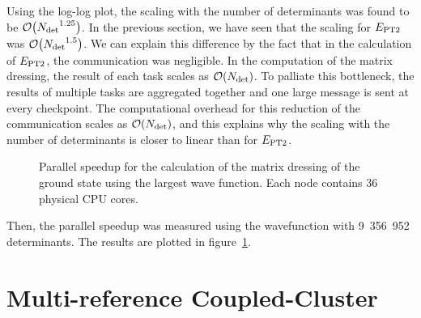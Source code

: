 \documentclass[./thesis.tex]{subfiles}
\begin{document}
Using the log-log plot, the scaling with the number of determinants was found to be
$\order{\Ndet^{1.25}}$. In the previous section, we have seen that the scaling for $E_\text{PT2}$ was
$\order{\Ndet^{1.5}}$. We can explain this difference by the fact that in the 
calculation of $E_\text{PT2}$, the communication was negligible. In the computation of the
matrix dressing, the result of each task scales as $\order{\Ndet}$. To palliate this 
bottleneck, the results of multiple tasks are aggregated together and one large message is
sent at every checkpoint. The computational overhead for this reduction of the communication
scales as $\order{\Ndet}$, and this explains why the scaling with the number of determinants is
closer to linear than for $E_\text{PT2}$.

\begin{figure}[hbt]
	\begin{center}
		\caption{Parallel speedup for the calculation of the matrix dressing of the ground state using the largest wave function. Each node contains 36 physical CPU cores.}
		\label{fig:scaling_node_sbk}
	\end{center}
\end{figure}

Then, the parallel speedup was measured using the wavefunction with 9~356~952 determinants. The results
are plotted in figure~\ref{fig:scaling_node_sbk}.

\clearpage

\section{Multi-reference Coupled-Cluster}
\end{document}
